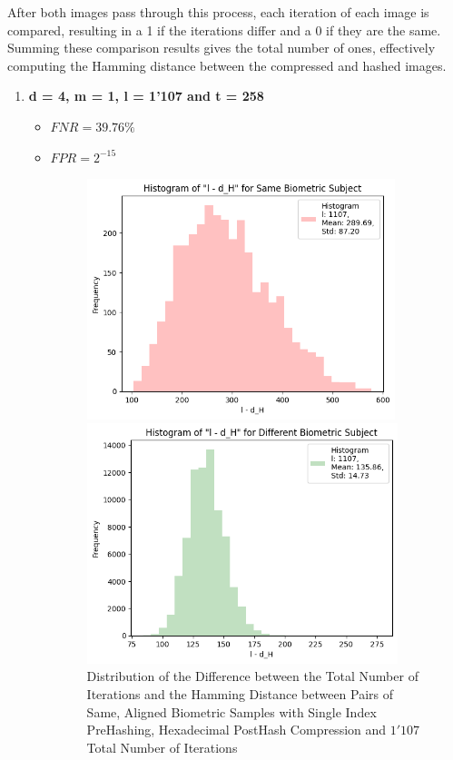 After both images pass through this process, each iteration of each image is compared, resulting in a 1 if the iterations differ and a 0 if they are the same. Summing these comparison results gives the total number of ones, effectively computing the Hamming distance between the compressed and hashed images.
\newpage
\begin{enumerate}
    \item \textbf{d = 4, m = 1, l = 1'107 and t = 258}
        \begin{itemize}
            \item $FNR = 39.76\%$
            \item $FPR = 2^{-15}$
            \begin{figure}[H]
                \centering
                \begin{minipage}[b]{0.48\linewidth}
                    \centering
                    \includegraphics[width=\linewidth,height=7cm,keepaspectratio]{latex-img/l-dHconfig1_same_compression.png}
                    \caption{Distribution of the Difference between the Total Number of Iterations and the Hamming Distance between Pairs of Same, Aligned Biometric Samples with Single Index PreHashing, Hexadecimal PostHash Compression and $1'107$ Total Number of Iterations}
                    \label{l-dHconfig1a_same}
                \end{minipage}
                \hfill
                \begin{minipage}[b]{0.48\linewidth}
                    \centering
                    \includegraphics[width=\linewidth,height=7cm,keepaspectratio]{latex-img/l-dHconfig1_diff_compression.png}

\end{minipage}
\end{figure}
\end{itemize}
\end{enumerate}
